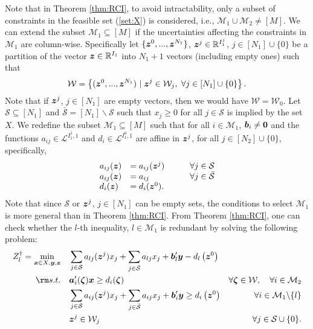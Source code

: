 \documentclass[fleqn,isre,blindrev]{informs4}
\newcommand{\mb}[1]{\mbox{\boldmath \ensuremath{#1}}}
\renewcommand{\Re}{\mathbb{R}}
\begin{document}
		Note that in Theorem \ref{thm:RCI}, to avoid intractability, only a subset of constraints in the feasible set (\ref{set:X}) is considered, i.e.,  $\mathcal{M}_1 \cup \mathcal{M}_2  \ne [M]$. We can extend the subset $\mathcal{M}_1 \subseteq[M]$ if the uncertainties affecting the constraints in $\mathcal{M}_1$ are column-wise.
		Specifically let $\{ \mb{z}^0,...,\mb{z}^{N_1}\}$, $\mb{z}^j\in \Re^{I_1^j}$, $j \in [N_1]\cup\{0\}$ be a partition of the vector $\mb{z} \in \mathbb{R}^{I_1}$ into $N_1+1$ vectors  (including empty ones) such that 
\begin{equation} \label{set:UScw} 
			\mathcal{W} = \left\{ (\mb{z}^0,...,\mb{z}^{N_1}) \hspace{3pt} | \hspace{3pt} \mb{z}^j \in \mathcal{W}_j, \hspace{3pt} \forall j \in [N_1]\cup \{0\} \right\}.
\end{equation}
		Note that if $\mb{z}^j$, $j \in [N_1]$ are empty vectors, then we would have $\mathcal{W} = \mathcal{W}_0$.  
		Let $\mathcal{S} \subseteq [N_1]$ and $\bar{\mathcal{S}} =[N_1] \backslash \mathcal{S}$ such that $x_j \geq 0$ for all $j \in \mathcal{S}$ is implied by the set $X$.  
		We redefine the subset $\mathcal{M}_1 \subseteq [M]$  such that for all $i \in  \mathcal{M}_1$, $\mb{b}_i \neq \mb{0}$ and  the functions $a_{ij}\in \mathcal{L}^{I_1^j, 1}$  and $d_i \in \mathcal{L}^{I_1^0, 1}$ are affine in  $\mb{z}^j$, for all $j \in [N_2]\cup \{0\}$, specifically, 
\begin{equation*}
		\begin{array}{lll}
		a_{ij}(\mb{z}) &= a_{ij}(\mb{z}^j) & \qquad\forall j \in \mathcal{S}\\
		a_{ij}(\mb{z}) &= a_{ij} & \qquad\forall j \in \bar{\mathcal{S}}\\
		d_i(\mb{z}) &= d_i(\mb{z}^0).
		\end{array}
\end{equation*}
		Note that since $\mathcal{S}$ or $\mb{z}^j$, $j \in [N_1]$ can be empty sets, the conditions to select $\mathcal{M}_1$ is more general than in Theorem \ref{thm:RCI}.  From Theorem \ref{thm:RCI}, one can check whether the $l$-th inequality, $l \in \mathcal{M}_1$  is redundant by solving the following problem:
\begin{equation}\label{mol:RCIcw}
			\begin{aligned} 
				Z^\dag_l =	\min_{ \boldsymbol{x} \in X , \boldsymbol{y}, \boldsymbol{z}} \quad &  \sum_{j\in \mathcal{S}} a_{lj}(\mb{z}^j) x_j + \sum_{j\in \bar{\mathcal{S} }} a_{lj} x_j  + \mb{b}'_l \mb{y} - d_l\left(\mb{z}^0\right)  \\
				{\rm s.t.}  \quad &  \mb{a}'_i(\mb{\zeta})\mb{x} \geq d_i(\mb{\zeta}) &  \forall  \mb{\zeta} \in  \mathcal{W}, \quad \forall i  \in \mathcal{M}_2 \\
				\quad &  \sum_{j\in \mathcal{S}} a_{ij}(\mb{z}^j) x_j + \sum_{j\in \bar{\mathcal{S} }} a_{ij} x_j  +\mb{b}'_i \mb{y} \geq d_i\left(\mb{z}^0\right)  &  \forall i  \in \mathcal{M}_1 \backslash \{l\} \\
				\quad & \mb{z}^j \in \mathcal{W}_j  &  \forall j  \in \mathcal{S} \cup \{0\}.
			\end{aligned}
\end{equation}
\end{document}
